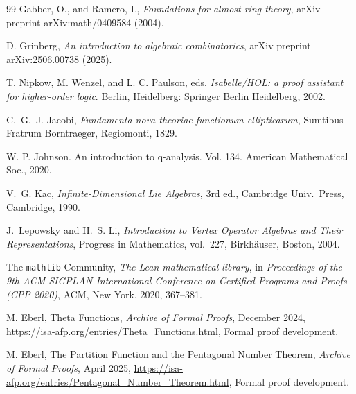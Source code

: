 \documentclass[12pt]{amsart}
\theoremstyle{definition}
\theoremstyle{remark}
\numberwithin{equation}{subsection}
\begin{document}
\begin{thebibliography}{99}
Gabber, O., and Ramero, L, \emph{Foundations for almost ring theory}, arXiv preprint arXiv:math/0409584 (2004).

D. Grinberg, \emph{An introduction to algebraic combinatorics}, arXiv preprint arXiv:2506.00738 (2025).


T. Nipkow, M. Wenzel, and L. C. Paulson, eds. \emph{Isabelle/HOL: a proof assistant for higher-order logic}. Berlin, Heidelberg: Springer Berlin Heidelberg, 2002.

C.~G.~J. Jacobi, \emph{Fundamenta nova theoriae functionum ellipticarum}, Sumtibus Fratrum Borntraeger, Regiomonti, 1829.

W. P. Johnson. An introduction to q-analysis. Vol. 134. American Mathematical Soc., 2020.

V.~G. Kac, \emph{Infinite-Dimensional Lie Algebras}, 3rd ed., Cambridge Univ.\ Press, Cambridge, 1990.

J.~Lepowsky and H.~S. Li, \emph{Introduction to Vertex Operator Algebras and Their Representations}, Progress in Mathematics, vol.~227, Birkh\"auser, Boston, 2004.


The \texttt{mathlib} Community, \emph{The Lean mathematical library}, in \emph{Proceedings of the 9th ACM SIGPLAN International Conference on Certified Programs and Proofs (CPP 2020)}, ACM, New York, 2020, 367--381.

M. Eberl, Theta Functions, \emph{Archive of Formal Proofs}, December 2024, \url{https://isa-afp.org/entries/Theta_Functions.html}, Formal proof development.

M. Eberl, The Partition Function and the Pentagonal Number Theorem, \emph{Archive of Formal Proofs}, April 2025, \url{https://isa-afp.org/entries/Pentagonal_Number_Theorem.html}, Formal proof development.


\end{thebibliography}
\end{document}
